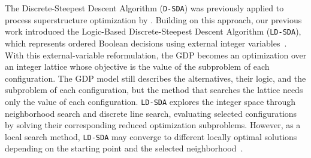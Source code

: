 \documentclass{article}
\begin{document}
The Discrete-Steepest Descent Algorithm (\texttt{D-SDA}) was previously applied to process superstructure optimization by \citet{linan2020optimal}.
Building on this approach, our previous work introduced the Logic-Based Discrete-Steepest Descent Algorithm (\texttt{LD-SDA}), which represents ordered Boolean decisions using external integer variables~\citep{ovalle2025logic}.
With this external-variable reformulation, the GDP becomes an optimization over an integer lattice whose objective is the value of the subproblem of each configuration.
The GDP model still describes the alternatives, their logic, and the subproblem of each configuration, but the method that searches the lattice needs only the value of each configuration.
\texttt{LD-SDA} explores the integer space through neighborhood search and discrete line search, evaluating selected configurations by solving their corresponding reduced optimization subproblems.
However, as a local search method, \texttt{LD-SDA} may converge to different locally optimal solutions depending on the starting point and the selected neighborhood~\citep{peng2024dynamic}.
\end{document}
